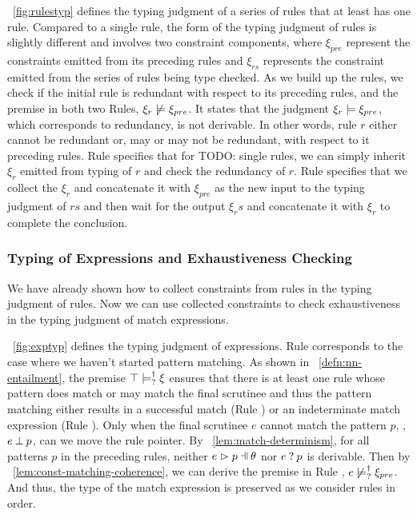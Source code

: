 \documentclass[runningheads,envcountsame,a4paper]{llncs}
\newcommand{\todo}[1]{{\color{red} TODO: #1}}
\begin{document}


\figurename~\ref{fig:rulestyp} defines the typing judgment of a series of rules
that at least has one rule. Compared to a single rule, the form of the typing
judgment of rules is slightly different and involves two constraint components,
where $\xi_{pre}$ represent the constraints emitted from its preceding rules and
$\xi_{rs}$ represents the constraint emitted from the series of rules being type
checked. As we build up the rules, we check if the initial rule is redundant
with respect to its preceding rules, and the premise in both two Rules,
$\xi_r \not\models \xi_{pre}$. It states that the judgment
$\xi_r \models \xi_{pre}$, which corresponds to redundancy, is not
derivable. In other words, rule $r$ either cannot be redundant or, may or may
not be redundant, with respect to it preceding rules. Rule \TOneRules specifies
that for \todo{single rules}, we can simply inherit $\xi_r$ emitted from typing
of $r$ and check the redundancy of $r$. Rule \TRules specifies that we collect
the $\xi_r$ and concatenate it with $\xi_{pre}$ as the new input to the typing
judgment of $rs$ and then wait for the output $\xi_rs$ and concatenate it with
$\xi_r$ to complete the conclusion.

\subsubsection{Typing of Expressions and Exhaustiveness Checking}

We have already shown how to collect constraints from rules in the typing
judgment of rules. Now we can use collected constraints to check exhaustiveness
in the typing judgment of match expressions.



\figurename~\ref{fig:exptyp} defines the typing judgment of expressions. Rule
\TMatchZPre corresponds to the case where we haven't started pattern matching.
As shown in ~\ref{defn:nn-entailment}, the premise
$\top \models_{?}^{\dag} \xi$ ensures that there is at least one rule whose
pattern does match or may match the final scrutinee and thus the pattern
matching either results in a successful match (Rule \ITSuccMatch) or an
indeterminate match expression (Rule \IMatch). Only when the final scrutinee $e$
cannot match the pattern $p$, \ie, $e \mathbin{\bot} p$, can we move the rule
pointer. By \lemmaname~\ref{lem:match-determinism}, for all patterns $p$ in the
preceding rules, neither $\hpatmatch{e}{p}{\theta}$ nor $e \mathbin{?} p$ is
derivable. Then by \lemmaname~\ref{lem:const-matching-coherence}, we can derive the
premise in Rule \TMatchNZPre, $e \not\models_{?}^{\dag} \xi_{pre}$. And thus, the
type of the match expression is preserved as we consider rules in order.
\end{document}

